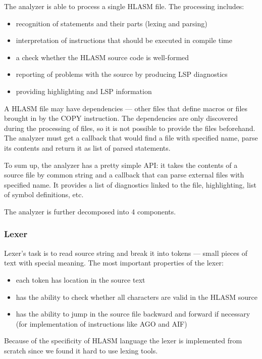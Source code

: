 The analyzer is able to process a single HLASM file. The processing includes:
\begin{itemize}
 \item recognition of statements and their parts (lexing and parsing)
 \item interpretation of instructions that should be executed in compile time
 \item a check whether the HLASM source code is well-formed
 \item reporting of problems with the source by producing LSP diagnostics
 \item providing highlighting and LSP information
\end{itemize}

A HLASM file may have dependencies --- other files that define macros or files brought in by the COPY instruction. The dependencies are only discovered during the processing of files, so it is not possible to provide the files beforehand. The analyzer must get a callback that would find a file with specified name, parse its contents and return it as list of parsed statements. 

To sum up, the analyzer has a pretty simple API: it takes the contents of a source file by common string and a callback that can parse external files with specified name. It provides a list of diagnostics linked to the file, highlighting, list of symbol definitions, etc.

The analyzer is further decomposed into 4 components.

\subsubsection{Lexer}

Lexer's task is to read source string and break it into tokens --- small pieces of text with special meaning. The most important properties of the lexer:
\begin{itemize}
	\item each token has location in the source text
	\item has the ability to check whether all characters are valid in the HLASM source
	\item has the ability to jump in the source file backward and forward if necessary (for implementation of instructions like AGO and AIF)
\end{itemize}

Because of the specificity of HLASM language the lexer is implemented from scratch since we found it hard to use lexing tools.

